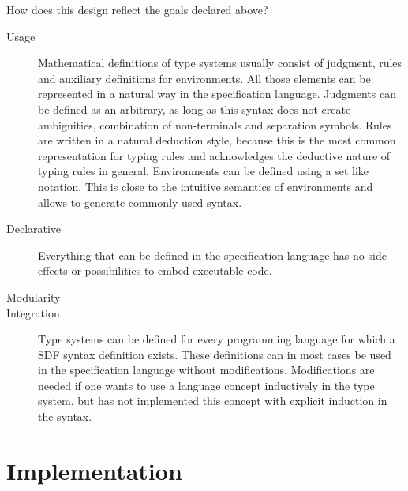 How does this design reflect the goals declared above?

\begin{description}
\item[Usage] Mathematical definitions of type systems usually consist
  of judgment, rules and auxiliary definitions for environments. All
  those elements can be represented in a natural way in the
  specification language. Judgments can be defined as an arbitrary, as long
  as this syntax does not create ambiguities, combination of
  non-terminals and separation symbols. Rules are written in a natural
  deduction style, because this is the most common representation for
  typing rules and acknowledges the deductive nature of typing rules
  in general. Environments can be defined using a set like
  notation. This is close to the intuitive semantics of environments
  and allows to generate commonly used syntax.
\item[Declarative] Everything that can be defined in the specification
  language has no side effects or possibilities to embed executable
  code.
\item[Modularity] 
\item[Integration] Type systems can be defined for every programming
  language for which a SDF syntax definition exists. These definitions
  can in most cases be used in the specification language without
  modifications. Modifications are needed if one wants to use a
  language concept inductively in the type system, but has not
  implemented this concept with explicit induction in the
  syntax.
\end{description}
\section{Implementation}

